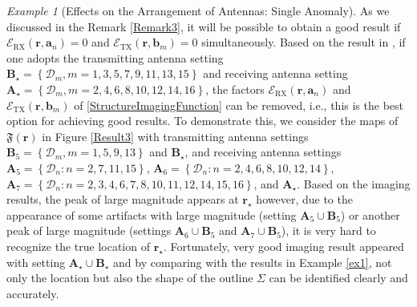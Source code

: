 \documentclass[3p,10pt]{elsarticle}
\newcommand{\set}[1]{\left\{#1\right\}}
\newcommand{\ma}{\mathbf{a}}
\newcommand{\mb}{\mathbf{b}}
\newcommand{\mr}{\mathbf{r}}
\DeclareMathOperator*{\tx}{TX}
\DeclareMathOperator*{\rx}{RX}
\theoremstyle{plain}
\theoremstyle{remark}
\newtheorem{example}{Example}[section]
\begin{document}
\begin{example}[Effects on the Arrangement of Antennas: Single Anomaly]\label{ex3}
As we discussed in the Remark \ref{Remark3}, it will be possible to obtain a good result if $\mathcal{E}_{\rx}(\mr,\ma_n)=0$ and $\mathcal{E}_{\tx}(\mr,\mb_m)=0$ simultaneously. Based on the result in \cite{P-SUB16}, if one adopts the transmitting antenna setting $\mathbf{B}_\star=\set{\mathcal{D}_m,m=1,3,5,7,9,11,13,15}$ and receiving antenna setting $\mathbf{A}_\star=\set{\mathcal{D}_m,m=2,4,6,8,10,12,14,16}$, the factors $\mathcal{E}_{\rx}(\mr,\ma_n)$ and $\mathcal{E}_{\tx}(\mr,\mb_m)$ of \eqref{StructureImagingFunction} can be removed, i.e., this is the best option for achieving good results. To demonstrate this, we consider the maps of $\mathfrak{F}(\mr)$ in Figure \ref{Result3} with transmitting antenna settings $\mathbf{B}_5=\set{\mathcal{D}_m,m=1,5,9,13}$ and $\mathbf{B}_\star$, and receiving antenna settings $\mathbf{A}_5=\set{\mathcal{D}_n:n=2,7,11,15}$, $\mathbf{A}_6=\set{\mathcal{D}_n:n=2,4,6,8,10,12,14}$, $\mathbf{A}_7=\set{\mathcal{D}_n:n=2,3,4,6,7,8,10,11,12,14,15,16}$, and $\mathbf{A}_\star$. Based on the imaging results, the peak of large magnitude appears at $\mr_\star$ however, due to the appearance of some artifacts with large magnitude (setting $\mathbf{A}_5\cup\mathbf{B}_5$) or another peak of large magnitude (settings $\mathbf{A}_6\cup\mathbf{B}_5$ and $\mathbf{A}_7\cup\mathbf{B}_5$), it is very hard to recognize the true location of $\mr_\star$. Fortunately, very good imaging result appeared with setting $\mathbf{A}_\star\cup\mathbf{B}_\star$ and by comparing with the results in Example \ref{ex1}, not only the location but also the shape of the outline $\Sigma$ can be identified clearly and accurately.
\end{example}
\end{document}
